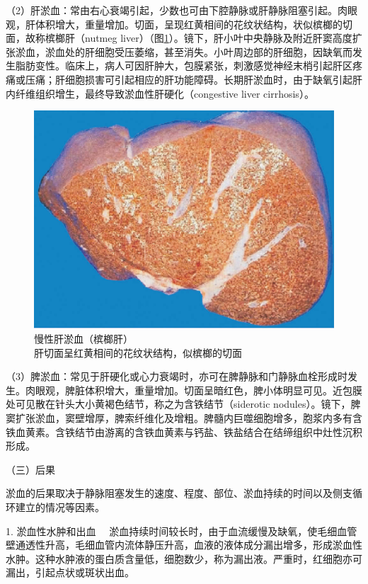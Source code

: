 （2）肝淤血：常由右心衰竭引起，少数也可由下腔静脉或肝静脉阻塞引起。肉眼观，肝体积增大，重量增加。切面，呈现红黄相间的花纹状结构，状似槟榔的切面，故称槟榔肝（nutmeg
liver）（图\ref{fig3-3}）。镜下，肝小叶中央静脉及附近肝窦高度扩张淤血，淤血处的肝细胞受压萎缩，甚至消失。小叶周边部的肝细胞，因缺氧而发生脂肪变性。临床上，病人可因肝肿大，包膜紧张，刺激感觉神经末梢引起肝区疼痛或压痛；肝细胞损害可引起相应的肝功能障碍。长期肝淤血时，由于缺氧引起肝内纤维组织增生，最终导致淤血性肝硬化（congestive
liver cirrhosis）。

\begin{figure}[!htbp]
\centering
\includegraphics{./images/Image00036.jpg}
\caption{慢性肝淤血（槟榔肝）\\ {\small 肝切面呈红黄相间的花纹状结构，似槟榔的切面}}
\label{fig3-3} 
\end{figure} 

（3）脾淤血：常见于肝硬化或心力衰竭时，亦可在脾静脉和门静脉血栓形成时发生。肉眼观，脾脏体积增大，重量增加。切面呈暗红色，脾小体明显可见。近包膜处可见散在针头大小黄褐色结节，称之为含铁结节（siderotic
nodules）。镜下，脾窦扩张淤血，窦壁增厚，脾索纤维化及增粗。脾髓内巨噬细胞增多，胞浆内多有含铁血黄素。含铁结节由游离的含铁血黄素与钙盐、铁盐结合在结缔组织中灶性沉积形成。

{（三）后果}

淤血的后果取决于静脉阻塞发生的速度、程度、部位、淤血持续的时间以及侧支循环建立的情况等因素。

{1. 淤血性水肿和出血}
　淤血持续时间较长时，由于血流缓慢及缺氧，使毛细血管壁通透性升高，毛细血管内流体静压升高，血液的液体成分漏出增多，形成淤血性水肿。这种水肿液的蛋白质含量低，细胞数少，称为漏出液。严重时，红细胞亦可漏出，引起点状或斑状出血。

